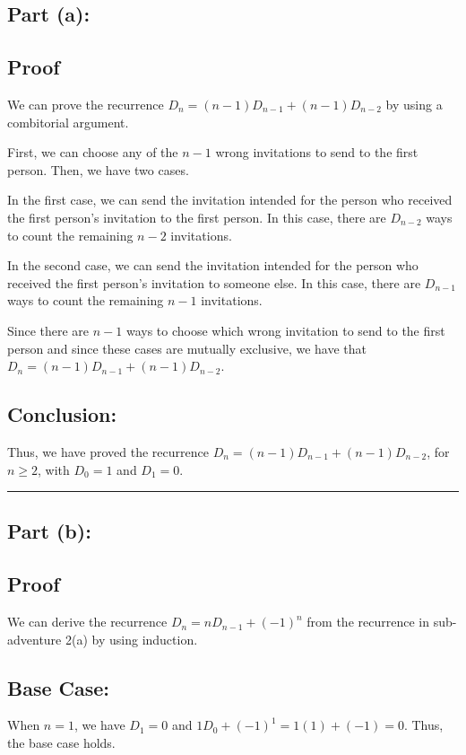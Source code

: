 \documentclass[answers]{exam}
\begin{document}
\begin{questions}
\begin{parts}
		\begin{solution}
			\subsection*{Part (a):}
			\subsection*{Proof}
			We can prove the recurrence $D_n = (n-1)D_{n-1} + (n-1)D_{n-2}$ by using a combitorial argument. 

			First, we can choose any of the $n-1$ wrong invitations to send to the first person.  Then, we have two cases.  
			
			In the first case, we can send the invitation intended for the person who received the first person's invitation to the first person.  In this case, there are $D_{n-2}$ ways to count the remaining $n-2$ invitations.  
			
			In the second case, we can send the invitation intended for the person who received the first person's invitation to someone else.  In this case, there are $D_{n-1}$ ways to count the remaining $n-1$ invitations.  
			
			Since there are $n-1$ ways to choose which wrong invitation to send to the first person and since these cases are mutually exclusive, we have that $D_n = (n-1)D_{n-1} + (n-1)D_{n-2}$.

			\subsection*{Conclusion:}
			Thus, we have proved the recurrence $D_n = (n-1)D_{n-1} + (n-1)D_{n-2}$, for $n \geq 2$, with $D_0 = 1$ and $D_1 = 0$.


			\noindent\rule{\textwidth}{0.4pt}
			\subsection*{Part (b):}
			\subsection*{Proof}
			We can derive the recurrence $D_n = nD_{n-1} +(-1)^n$ from the recurrence in sub-adventure 2(a) by using induction.
			\subsection*{Base Case:}
			When $n=1$, we have $D_1 = 0$ and $1D_0 + (-1)^1 = 1(1) + (-1) = 0$.  Thus, the base case holds.


\end{solution}
\end{parts}
\end{questions}
\end{document}
